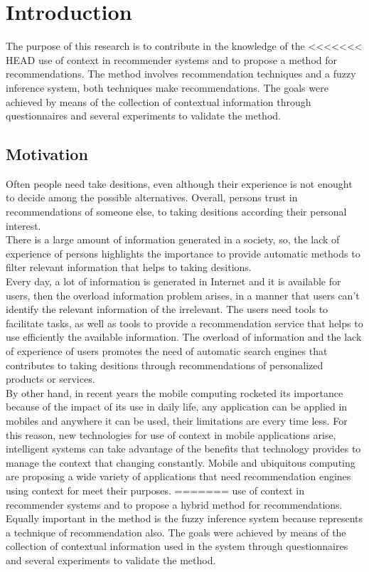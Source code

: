 \chapter{Introduction} \label{introduction} 

The purpose of this research is to contribute in the knowledge of the
<<<<<<< HEAD
use of context in recommender systems and to propose a method
for recommendations. The method involves recommendation techniques and a fuzzy inference system, both techniques make recommendations.
The goals were achieved by means of the collection of contextual
information through questionnaires and several experiments to validate the method.

\section{Motivation}

Often people need take desitions, even although their experience is
not enought to decide among the possible alternatives. Overall,
persons trust in recommendations of someone else, to taking desitions
according their personal interest.\\
There is a large amount of information generated in a society, so, the
lack of experience of persons highlights the importance to provide
automatic methods to filter relevant information that helps to taking
desitions. \\Every day, a lot of information is generated in Internet
and it is available for users, then the overload information problem
arises, in a manner that users can't identify the relevant information
of the irrelevant. The users need tools to facilitate tasks, as well
as tools to provide a recommendation service that helps to use
efficiently the available information. The overload of information and
the lack of experience of users promotes the need of automatic search
engines that contributes to taking desitions through recommendations
of personalized products or services. \\ By other hand, in recent
years  the mobile computing rocketed its importance because of the
impact of its use in daily life, any application can be applied in
mobiles and anywhere it can be used, their limitations are every time
less. For this reason, new technologies for use of context in mobile
applications arise, intelligent systems can take advantage of the
benefits that technology provides to manage the context that changing
constantly. Mobile and ubiquitous computing\cite{noguera2012mobile}
\cite{chiou2010adaptive} are proposing a wide variety of applications
that need recommendation engines using context for meet their
purposes.
=======
use of context in recommender systems and to propose a hybrid method
for recommendations. Equally important in the method is the fuzzy
inference system because represents a
technique of recommendation also. The goals were achieved by means of
the collection of contextual information used in the system through
questionnaires and several experiments to validate the method.

